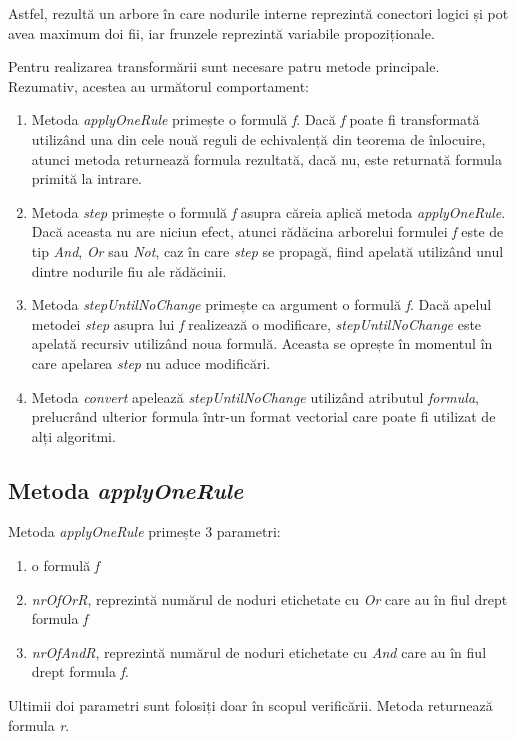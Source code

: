 Astfel, rezultă un arbore în care nodurile interne reprezintă conectori logici și pot avea maximum doi fii, iar frunzele reprezintă variabile propoziționale.

Pentru realizarea transformării sunt necesare patru metode principale. Rezumativ, acestea au următorul comportament:
\begin{enumerate}
	\item Metoda \textit{applyOneRule} primește o formulă \textit{f}. Dacă \textit{f} poate fi transformată utilizând una din cele nouă reguli de echivalență din teorema de înlocuire, atunci metoda returnează formula rezultată, dacă nu, este returnată formula primită la intrare.
	\item Metoda \textit{step} primește o formulă \textit{f} asupra căreia aplică metoda \textit{applyOneRule}. Dacă aceasta nu are niciun efect, atunci rădăcina arborelui formulei \textit{f} este de tip \textit{And}, \textit{Or} sau \textit{Not}, caz în care \textit{step} se propagă, fiind apelată utilizând unul dintre nodurile fiu ale rădăcinii. 
	\item Metoda \textit{stepUntilNoChange} primește ca argument o formulă \textit{f}. Dacă apelul metodei \textit{step} asupra lui \textit{f} realizează o modificare, \textit{stepUntilNoChange} este apelată recursiv utilizând noua formulă. Aceasta se oprește în momentul în care apelarea \textit{step} nu aduce modificări.
	\item Metoda \textit{convert} apelează \textit{stepUntilNoChange} utilizând atributul \textit{formula}, prelucrând ulterior formula într-un format vectorial care poate fi utilizat de alți algoritmi.
\end{enumerate}

\subsection{Metoda \textit{applyOneRule}}

Metoda \textit{applyOneRule} primește 3 parametri:
\begin{enumerate}
\item o formulă \textit{f}
\item \textit{nrOfOrR}, reprezintă numărul de noduri etichetate cu \textit{Or} care au în fiul drept formula \textit{f}
\item \textit{nrOfAndR}, reprezintă numărul de noduri etichetate cu \textit{And} care au în fiul drept formula \textit{f}.
\end{enumerate} 
Ultimii doi parametri sunt folosiți doar în scopul verificării. Metoda returnează formula \textit{r}.


